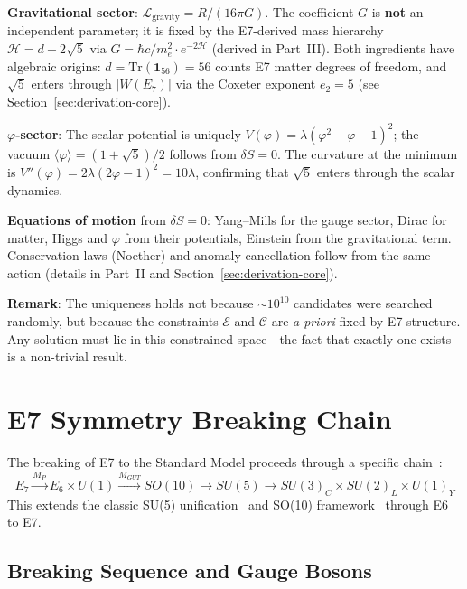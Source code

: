 \documentclass[11pt,a4paper]{article}
\begin{document}
\textbf{Gravitational sector}: $\mathcal{L}_{\text{gravity}} = R/(16\pi G)$. The coefficient $G$ is \textbf{not} an independent parameter; it is fixed by the E7-derived mass hierarchy $\mathcal{H} = d - 2\sqrt{5}$ via $G = \hbar c/m_e^2 \cdot e^{-2\mathcal{H}}$ (derived in Part~III). Both ingredients have algebraic origins: $d = \mathrm{Tr}(\mathbf{1}_{56}) = 56$ counts E7 matter degrees of freedom, and $\sqrt{5}$ enters through $|W(E_7)|$ via the Coxeter exponent $e_2 = 5$ (see Section~\ref{sec:derivation-core}).

\textbf{$\varphi$-sector}: The scalar potential is uniquely $V(\varphi) = \lambda(\varphi^2 - \varphi - 1)^2$; the vacuum $\langle\varphi\rangle = (1+\sqrt{5})/2$ follows from $\delta S = 0$. The curvature at the minimum is $V''(\varphi) = 2\lambda(2\varphi - 1)^2 = 10\lambda$, confirming that $\sqrt{5}$ enters through the scalar dynamics.

\textbf{Equations of motion} from $\delta S = 0$: Yang--Mills for the gauge sector, Dirac for matter, Higgs and $\varphi$ from their potentials, Einstein from the gravitational term. Conservation laws (Noether) and anomaly cancellation follow from the same action (details in Part~II and Section~\ref{sec:derivation-core}).

\textbf{Remark}: The uniqueness holds not because $\sim 10^{10}$ candidates were searched randomly, but because the constraints $\mathcal{E}$ and $\mathcal{C}$ are \textit{a priori} fixed by E7 structure. Any solution must lie in this constrained space---the fact that exactly one exists is a non-trivial result.

\section{E7 Symmetry Breaking Chain}

The breaking of E7 to the Standard Model proceeds through a specific chain~\cite{Slansky1981,Ross1984}:
\begin{equation}
E_7 \xrightarrow{M_P} E_6 \times U(1) \xrightarrow{M_{GUT}} SO(10) \xrightarrow{} SU(5) \xrightarrow{} SU(3)_C \times SU(2)_L \times U(1)_Y
\end{equation}
This extends the classic SU(5) unification~\cite{Georgi1974} and SO(10) framework~\cite{Fritzsch1975} through E6~\cite{Gursey1976} to E7.

\subsection{Breaking Sequence and Gauge Bosons}
\end{document}

